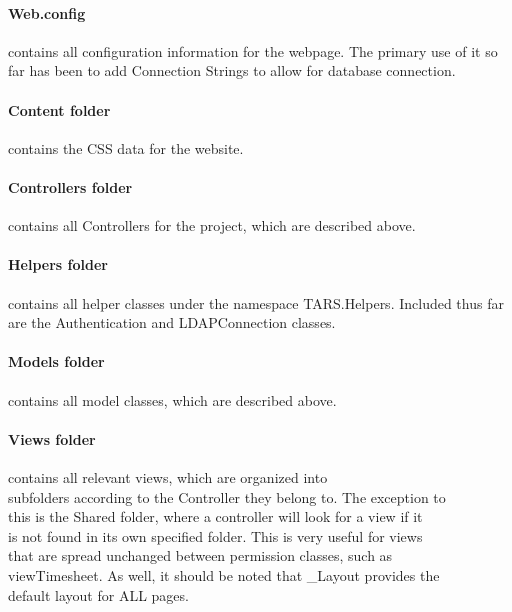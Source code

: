 \documentclass[letterpaper]{article}
\begin{document}
{\paragraph{Web.config} contains all configuration information for the webpage. The primary use of it so far has been to add Connection Strings to allow for database connection.
\paragraph{Content folder} contains the CSS data for the website.
\paragraph{Controllers folder} contains all Controllers for the project, which are described above.
\paragraph{Helpers folder} contains all helper classes under the namespace TARS.Helpers. Included thus far are the Authentication and LDAPConnection classes.
\paragraph{Models folder} contains all model classes, which are described above.
\paragraph{Views folder} contains all relevant views, which are organized into 
\\subfolders according to the Controller they belong to. The exception to
\\this is the Shared folder, where a controller will look for a view if it
\\is not found in its own specified folder. This is very useful for views 
\\that are spread unchanged between permission classes, such as 
\\viewTimesheet. As well, it should be noted that \_Layout provides the
\\default layout for ALL pages.
}
\pagebreak
\end{document}
